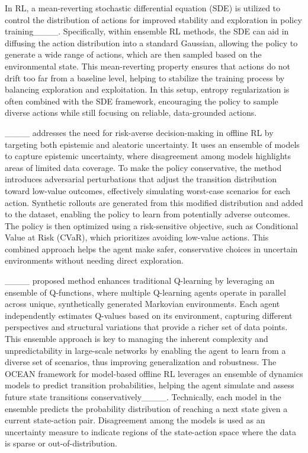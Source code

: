 In RL, a mean-reverting stochastic differential equation (SDE) is utilized to control the distribution of actions for improved stability and exploration in policy training____. Specifically, within ensemble RL methods, the SDE can aid in diffusing the action distribution into a standard Gaussian, allowing the policy to generate a wide range of actions, which are then sampled based on the environmental state. This mean-reverting property ensures that actions do not drift too far from a baseline level, helping to stabilize the training process by balancing exploration and exploitation. In this setup, entropy regularization is often combined with the SDE framework, encouraging the policy to sample diverse actions while still focusing on reliable, data-grounded actions.

 ____ addresses the need for risk-averse decision-making in offline RL by targeting both epistemic and aleatoric uncertainty. It uses an ensemble of models to capture epistemic uncertainty, where disagreement among models highlights areas of limited data coverage. To make the policy conservative, the method introduces adversarial perturbations that adjust the transition distribution toward low-value outcomes, effectively simulating worst-case scenarios for each action. Synthetic rollouts are generated from this modified distribution and added to the dataset, enabling the policy to learn from potentially adverse outcomes. The policy is then optimized using a risk-sensitive objective, such as Conditional Value at Risk (CVaR), which prioritizes avoiding low-value actions. This combined approach helps the agent make safer, conservative choices in uncertain environments without needing direct exploration. 

____ proposed method enhances traditional Q-learning by leveraging an ensemble of Q-functions, where multiple Q-learning agents operate in parallel across unique, synthetically generated Markovian environments. Each agent independently estimates Q-values based on its environment, capturing different perspectives and structural variations that provide a richer set of data points. This ensemble approach is key to managing the inherent complexity and unpredictability in large-scale networks by enabling the agent to learn from a diverse set of scenarios, thus improving generalization and robustness. The OCEAN framework for model-based offline RL leverages an ensemble of dynamics models to predict transition probabilities, helping the agent simulate and assess future state transitions conservatively____. Technically, each model in the ensemble predicts the probability distribution of reaching a next state given a current state-action pair. Disagreement among the models is used as an uncertainty measure to indicate regions of the state-action space where the data is sparse or out-of-distribution.